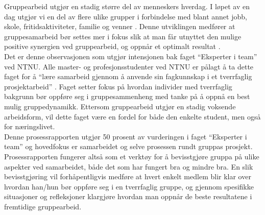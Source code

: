 Gruppearbeid utgjør en stadig større del av menneskers hverdag. I løpet av en dag utgjør vi en del av flere ulike grupper i forbindelse med blant annet jobb, skole, fritidsaktiviteter, familie og venner \citep{gruppeteori}. Denne utviklingen medfører at gruppesamarbeid bør settes mer i fokus slik at man får utnyttet den mulige positive synergien ved gruppearbeid, og oppnår et optimalt resultat \citep{gruppeteori}.\\

Det er denne observasjonen som utgjør intensjonen bak faget “Eksperter i team” ved NTNU. Alle master- og profesjonsstudenter ved NTNU er pålagt å ta dette faget for å “lære samarbeid gjennom å anvende sin fagkunnskap i et tverrfaglig prosjektarbeid” \citep{website:emnebeskrivelse}. Faget setter fokus på hvordan individer med tverrfaglig bakgrunn bør oppføre seg i gruppesammenheng med tanke på å oppnå en best mulig gruppedynamikk. Ettersom gruppearbeid utgjør en stadig voksende arbeidsform, vil dette faget være en fordel for både den enkelte student, men også for næringslivet.\\

Denne prosessrapporten utgjør 50 prosent av vurderingen i faget “Eksperter i team” og hovedfokus er samarbeidet og selve prosessen rundt gruppas prosjekt. Prosessrapporten fungerer altså som et verktøy for å bevisstgjøre gruppa på ulike aspekter ved samarbeidet, både det som har fungert bra og mindre bra. En slik bevisstgjøring vil forhåpentligvis medføre at hvert enkelt medlem blir klar over hvordan han/hun bør oppføre seg i en tverrfaglig gruppe, og gjennom spesifikke situasjoner og refleksjoner klargjøre hvordan man oppnår de beste resultatene i fremtidige gruppearbeid.
